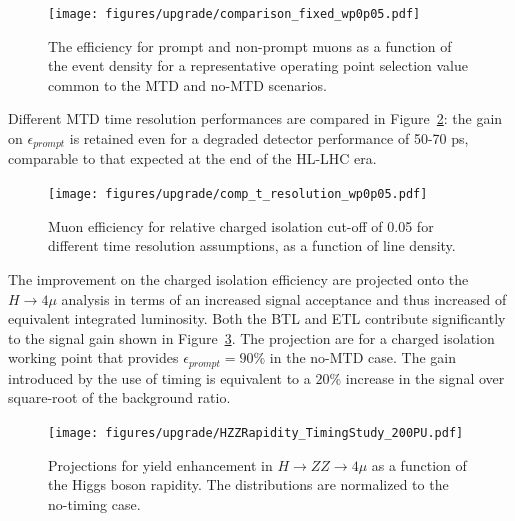 \begin{figure}
  \centering
  \texttt{[image: figures/upgrade/comparison\_fixed\_wp0p05.pdf]}
  \caption{The efficiency for prompt and non-prompt muons as a function of the event density
    for a representative operating point selection value common to the MTD and no-MTD scenarios.}
  \label{fig:muon_iso_vs_density}
\end{figure}

Different MTD time resolution performances are compared in Figure~\ref{fig:muon_iso_res_comp}: the gain on $\epsilon_{prompt}$
is retained even for a degraded detector performance of 50-70 ps, comparable to that expected at the end of the HL-LHC era.

\begin{figure}[h!]
  \centering
  \texttt{[image: figures/upgrade/comp\_t\_resolution\_wp0p05.pdf]}
  \caption{Muon efficiency for relative charged isolation cut-off of 0.05 for different time resolution assumptions, as
    a function of line density.}
  \label{fig:muon_iso_res_comp}
\end{figure}

The improvement on the charged isolation efficiency are projected onto the $H \to 4\mu$ analysis in terms of
an increased signal acceptance and thus increased of equivalent integrated luminosity.
Both the BTL and ETL contribute significantly to the signal gain shown in Figure~\ref{fig:H_4mu_gain}. The
projection are for a charged isolation working point that provides $\epsilon_{prompt}= 90\%$ in the no-MTD case.
The gain introduced by the use of timing is equivalent to a $20\%$ increase in the signal over square-root of the background
ratio.

\begin{figure}
  \centering
  \texttt{[image: figures/upgrade/HZZRapidity\_TimingStudy\_200PU.pdf]}
  \caption{Projections for yield enhancement in $H\to ZZ\to 4\mu$ as a function of the Higgs boson rapidity.
    The distributions are normalized to the no-timing case.}
  \label{fig:H_4mu_gain}
\end{figure}

\clearpage
